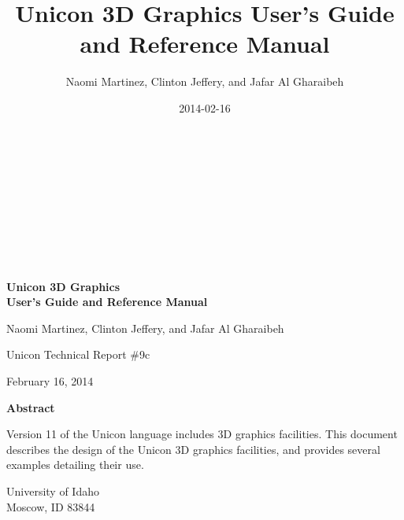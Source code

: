 \documentclass[letterpaper]{article}
\title{Unicon 3D Graphics User's Guide and Reference Manual}
\author{Naomi Martinez, Clinton Jeffery, and Jafar Al Gharaibeh}
\date{2014-02-16}
\begin{document}
\clearpage\setcounter{page}{1}\pagestyle{Nextconverti}
\thispagestyle{Standard}

\ \\
\ \\
\ \\
\ \\
\ \\
\ \\
\ \\

\begin{center}
{\Large\bfseries
Unicon 3D Graphics\\
User's Guide and Reference Manual
}
\end{center}

\bigskip

\bigskip

\bigskip

\bigskip

\bigskip

\bigskip

\bigskip


{\centering{}
Naomi Martinez, Clinton Jeffery, and Jafar Al Gharaibeh
\par}

{\centering{}
Unicon Technical Report \#9c
\par}

{\centering{}
February 16, 2014
\par}

\bigskip

\bigskip

\bigskip

\bigskip

\bigskip

{\centering{}\bfseries
Abstract
\par}


\bigskip

{
Version 11 of the Unicon language includes 3D graphics facilities. This document describes the design of the Unicon 3D
graphics facilities, and provides several examples detailing their use.}


\bigskip


\bigskip


\bigskip


\bigskip


\bigskip

{\centering{}
University of Idaho\\
Moscow, ID 83844
\par}
\end{document}
